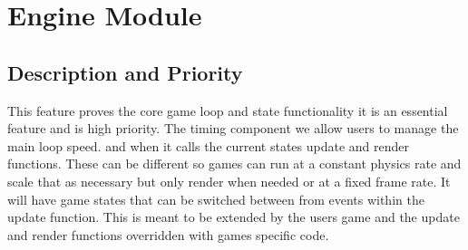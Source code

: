 \documentclass{scrreprt}
\begin{document}
%




\section{Engine Module}
\subsection{Description and Priority}
This feature proves the core game loop and state functionality it is an essential feature and is high priority.  The timing component we allow users to manage the main loop speed. and when it calls the current states update and render functions.  These can be different so games can run at a constant physics rate and scale that as necessary but only render when needed or at a fixed frame rate.  It will have game states that can be switched between from events within the update function.  This is meant to be extended by the users game and the update and render functions overridden with games specific code.
\end{document}
